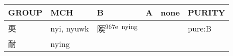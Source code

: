 \documentclass[14pt,a4paper]{scrartcl}
\begin{document}
\begin{longtable}[c]{@{}llllll@{}}
\toprule
\begin{minipage}[b]{0.14\columnwidth}\raggedright\strut
GROUP
\strut\end{minipage} &
\begin{minipage}[b]{0.14\columnwidth}\raggedright\strut
MCH
\strut\end{minipage} &
\begin{minipage}[b]{0.14\columnwidth}\raggedright\strut
B
\strut\end{minipage} &
\begin{minipage}[b]{0.14\columnwidth}\raggedright\strut
A
\strut\end{minipage} &
\begin{minipage}[b]{0.14\columnwidth}\raggedright\strut
none
\strut\end{minipage} &
\begin{minipage}[b]{0.14\columnwidth}\raggedright\strut
PURITY
\strut\end{minipage}\tabularnewline
\midrule
\endhead
\begin{minipage}[t]{0.14\columnwidth}\raggedright\strut
耎
\strut\end{minipage} &
\begin{minipage}[t]{0.14\columnwidth}\raggedright\strut
nyi, nyuwk
\strut\end{minipage} &
\begin{minipage}[t]{0.14\columnwidth}\raggedright\strut
陾\textsuperscript{967e~nying}
\strut\end{minipage} &
\begin{minipage}[t]{0.14\columnwidth}\raggedright\strut
\strut\end{minipage} &
\begin{minipage}[t]{0.14\columnwidth}\raggedright\strut
\strut\end{minipage} &
\begin{minipage}[t]{0.14\columnwidth}\raggedright\strut
pure:B
\strut\end{minipage}\tabularnewline
\begin{minipage}[t]{0.14\columnwidth}\raggedright\strut
耐
\strut\end{minipage} &
\begin{minipage}[t]{0.14\columnwidth}\raggedright\strut
nying
\strut\end{minipage} &
\begin{minipage}[t]{0.14\columnwidth}\raggedright\strut
\strut\end{minipage} &

\end{longtable}
\end{document}
